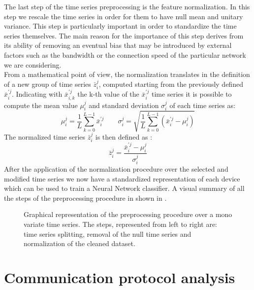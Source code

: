 The last step of the time series preprocessing is the feature normalization. In this step we rescale the time series in order for them to have null mean and unitary variance. This step is particularly important in order to standardize the time series themselves. The main reason for the importance of this step derives from its ability of removing an eventual bias that may be introduced by external factors such as the bandwidth or the connection speed of the particular network we are considering. \\
From a mathematical point of view, the normalization translates in the definition of a new group of time series $\bar{z}^{j}_i$, computed starting from the previously defined $\bar{x}^{\prime j}_i$. Indicating with $\bar{x}^{\prime j}_{i,k}$ the k-th value of the $\bar{x}^{\prime j}_i$ time series it is possible to compute the mean value $\mu_i^j$ and standard deviation $\sigma_i^j$ of each time series as:
\begin{equation}
\mu_i^j = \frac{1}{L}\sum_{k=0}^{L-1} \bar{x}^{\prime j}_i\qquad
    \sigma_i^j = \sqrt{\frac{1}{L}\sum_{k=0}^{L-1}
                \left(\bar{x}^{\prime j}_i-\mu_i^j\right)}
\end{equation}
The normalized time series $\bar{z}^{j}_i$ is then defined as :
\begin{equation}
    \bar{z}^{j}_i = \frac{\bar{x}^{\prime j}_i - \mu_i^j}{\sigma_i^j}
\end{equation}
After the application of the normalization procedure over the selected and modified time series we now have a standardized representation of each device which can be used to train a Neural Network classifier. A visual summary of all the steps of the preprocessing procedure in shown in .



\begin{figure}
    \centering

%
\caption{Graphical representation of the preprocessing procedure over a mono variate time series. The steps, represented from left to right are: time series splitting, removal of the null time series and normalization of the cleaned dataset.}
    \label{fig:ts_processing}
\end{figure}

\section{Communication protocol analysis}

